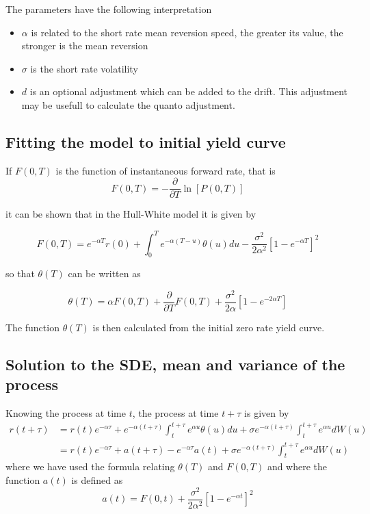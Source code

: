 The parameters have the following interpretation
\begin{itemize}
\item $\alpha$ is related to the short rate mean reversion speed, the greater its value, the stronger is the mean reversion
\item $\sigma$ is the short rate volatility
\item $d$ is an optional adjustment which can be added to the drift. This adjustment may be usefull
to calculate the quanto adjustment.
\end{itemize}

\subsection{Fitting the model to initial yield curve}

If $F(0,T)$ is the function of instantaneous forward rate, that is
\begin{equation}
F(0,T) = -\displaystyle \frac{\partial}{\partial T}\ln[P(0,T)]
\end{equation}

it can be shown that in the Hull-White model it is given by

\begin{equation}
F(0,T) = e^{-\alpha T}r(0) + \int_0^T e^{-\alpha (T-u)}\theta(u)du - \frac{\sigma^2}{2\alpha^2}\left[1-e^{-\alpha T}\right]^2
\end{equation}

so that $\theta(T)$ can be written as

\begin{equation}
\theta(T) = \alpha F(0,T)+\frac{\partial}{\partial T}F(0,T)+\frac{\sigma^2}{2\alpha}\left[1-e^{-2\alpha T}\right]
\end{equation}

The function $\theta(T)$ is then calculated from the initial zero rate yield curve.

\subsection{Solution to the SDE, mean and variance of the process}

Knowing the process at time $t$, the process at time $t+\tau$ is given by
\begin{align}
r(t+\tau) & = r(t) e^{-\alpha \tau} + e^{-\alpha (t+\tau)}\int_t^{t+\tau}\!\!\!\!e^{\alpha u}\theta(u)du + \sigma e^{-\alpha (t+\tau)}\int_t^{t+\tau}\!\!\!\!e^{\alpha u}dW(u)\\
 & = r(t) e^{-\alpha \tau} + a(t+\tau) - e^{-\alpha \tau} a(t) + \sigma e^{-\alpha (t+\tau)}\int_t^{t+\tau}\!\!\!\!e^{\alpha u}dW(u) \label{eq:HWevol}
\end{align}
where we have used the formula relating $\theta(T)$ and $F(0,T)$ and where the function $a(t)$ is defined as
\begin{equation}
a(t) = F(0,t) + \frac{\sigma^2}{2\alpha^2}\left[1-e^{-\alpha t}\right]^2
\end{equation}

